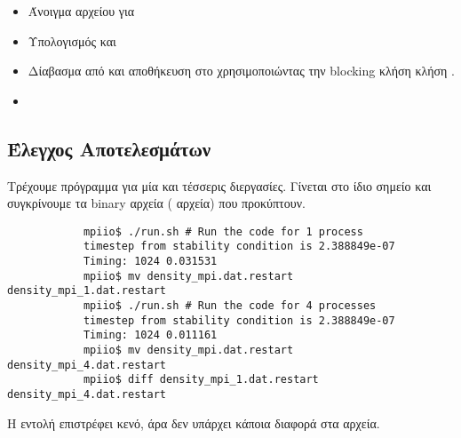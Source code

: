 \documentclass[11pt]{scrartcl} %
\begin{document}
        \subsubsection*{}
            \begin{itemize}
                \item Άνοιγμα αρχείου για 
                \item Υπολογισμός  και 
                \item Δίαβασμα  από  και αποθήκευση στο  χρησιμοποιώντας την blocking κλήση κλήση .
                \item {}
            \end{itemize}


    \subsection{Έλεγχος Αποτελεσμάτων}

        Τρέχουμε πρόγραμμα για μία και τέσσερις διεργασίες.
        Γίνεται  στο ίδιο σημείο και συγκρίνουμε τα binary αρχεία ( αρχεία) που προκύπτουν.

        \begin{verbatim}
            mpiio$ ./run.sh # Run the code for 1 process
            timestep from stability condition is 2.388849e-07
            Timing: 1024 0.031531
            mpiio$ mv density_mpi.dat.restart density_mpi_1.dat.restart
            mpiio$ ./run.sh # Run the code for 4 processes
            timestep from stability condition is 2.388849e-07
            Timing: 1024 0.011161
            mpiio$ mv density_mpi.dat.restart density_mpi_4.dat.restart
            mpiio$ diff density_mpi_1.dat.restart density_mpi_4.dat.restart
        \end{verbatim}
        
        Η εντολή  επιστρέφει κενό, άρα δεν υπάρχει κάποια διαφορά στα αρχεία.


    
\end{document}
